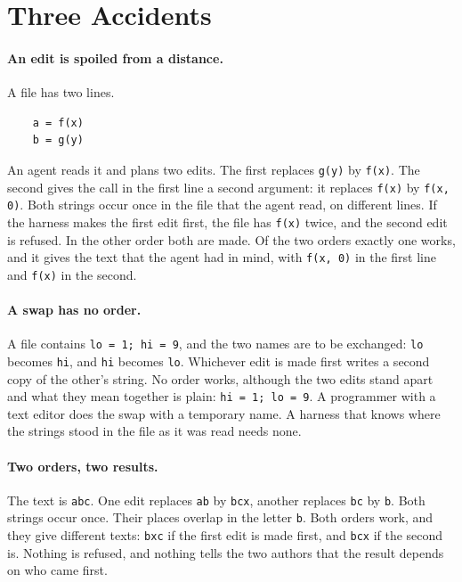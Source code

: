 \documentclass[acmsmall,nonacm,screen]{acmart}
\newcommand{\str}[1]{\texttt{#1}}
\newcommand{\claim}[2]{#2}
\begin{document}
\section{Three Accidents}\label{sec:accidents}

\paragraph{An edit is spoiled from a distance.} A file has two lines.
\begin{verbatim}
    a = f(x)
    b = g(y)
\end{verbatim}
An agent reads it and plans two edits. The first replaces \str{g(y)} by \str{f(x)}. The
second gives the call in the first line a second argument: it replaces \str{f(x)} by
\str{f(x, 0)}. Both strings occur once in the file that the agent read, on different lines.
If the harness makes the first edit first, the file has \str{f(x)} twice, and the second edit
is refused. In the other order both are made. \claim{distance}{Of the two orders exactly one
works, and it gives the text that the agent had in mind, with \str{f(x, 0)} in the first line
and \str{f(x)} in the second.}

\paragraph{A swap has no order.} A file contains \str{lo = 1; hi = 9}, and the two names are
to be exchanged: \str{lo} becomes \str{hi}, and \str{hi} becomes \str{lo}. Whichever edit is
made first writes a second copy of the other's string. \claim{swap}{No order works, although
the two edits stand apart and what they mean together is plain: \str{hi = 1; lo = 9}.} A
programmer with a text editor does the swap with a temporary name. A harness that knows where
the strings stood in the file as it was read needs none.

\paragraph{Two orders, two results.} The text is \str{abc}. One edit replaces \str{ab} by
\str{bcx}, another replaces \str{bc} by \str{b}. Both strings occur once. Their places
overlap in the letter \str{b}. \claim{differ}{Both orders work, and they give different
texts: \str{bxc} if the first edit is made first, and \str{bcx} if the second is.} Nothing is
refused, and nothing tells the two authors that the result depends on who came first.
\end{document}
